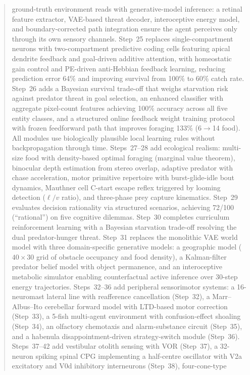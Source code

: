 \documentclass[11pt,a4paper]{article}
\begin{document}
\begin{abstract}
ground-truth environment reads with generative-model inference: a retinal
feature extractor, VAE-based threat decoder, interoceptive energy model,
and boundary-corrected path integration ensure the agent perceives only
through its own sensory channels.
Step~25 replaces single-compartment neurons with two-compartment
predictive coding cells featuring apical dendrite feedback and
goal-driven additive attention, with homeostatic gain control and
PE-driven anti-Hebbian feedback learning, reducing prediction error
64\% and improving survival from 100\% to 60\% catch rate.
Step~26 adds a Bayesian survival trade-off that weighs starvation risk
against predator threat in goal selection, an enhanced classifier with
aggregate pixel-count features achieving 100\% accuracy across all five
entity classes, and a structured online feedback weight training protocol
with frozen feedforward path that improves foraging 133\% (6$\to$14 food).
All modules use biologically plausible local learning rules without
backpropagation through time.
Steps~27--28 add ecological realism: multi-size food with density-based
optimal foraging (marginal value theorem), binocular depth estimation from
stereo overlap, adaptive predator with chase acceleration, motor primitive
repertoire with burst-glide-idle bout dynamics, Mauthner cell C-start
escape reflex triggered by looming detection ($\ell/v$ ratio), and
three-phase prey capture kinematics.
Step~29 evaluates decision rationality via structured scenarios, achieving
72/100 (``rational'') on five cognitive dilemmas.
Step~30 completes curriculum reinforcement learning with a Bayesian
starvation trade-off resolving the dual predator-hunger threat.
Step~31 replaces the monolithic VAE world model with three domain-specific
generative models: a geographic model ($40{\times}30$ grid of obstacle
occupancy and food density), a Kalman-filter predator belief model with
object permanence, and an interoceptive metabolic simulator enabling
counterfactual active inference over 30-step energy trajectories.
Steps~32--36 add peripheral sensorimotor systems: a 16-neuromast lateral
line with reafference cancellation (Step~32), a Marr--Albus--Ito cerebellar
forward model with LTD-based motor correction (Step~33), a 5-fish
multi-agent environment with confusion-effect shoaling (Step~34),
an olfactory chemotaxis and alarm-substance circuit (Step~35), and a
habenula disappointment-driven strategy-switch module (Step~36).
Steps~37--42 add vestibular otolith sensing with VOR (Step~37), a
32-neuron spiking spinal CPG implementing a half-centre oscillator with
V2a excitatory and V0d inhibitory interneurons (Step~38), four-cone-type

\end{abstract}
\end{document}

